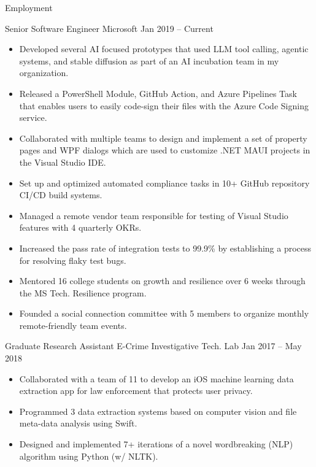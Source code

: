\documentclass[]{mcdowellcv}
\begin{document}
	\makeheader
	
	\begin{cvsection}{Employment}
		\begin{cvsubsection} {Senior Software Engineer} {Microsoft} {Jan 2019 -- Current}
			\begin{itemize}
				\item Developed several AI focused prototypes that used LLM tool calling, agentic systems, and stable diffusion as part of an AI incubation team in my organization.
				\item Released a PowerShell Module, GitHub Action, and Azure Pipelines Task that enables users to easily code-sign their files with the Azure Code Signing service.
				\item Collaborated with multiple teams to design and implement a set of property pages and WPF dialogs which are used to customize .NET MAUI projects in the Visual Studio IDE.
                \item Set up and optimized automated compliance tasks in 10+ GitHub repository CI/CD build systems.
				\item Managed a remote vendor team responsible for testing of Visual Studio features with 4 quarterly OKRs.
				\item Increased the pass rate of integration tests to 99.9\% by establishing a process for resolving flaky test bugs.	
				\item Mentored 16 college students on growth and resilience over 6 weeks through the MS Tech. Resilience program.
				\item Founded a social connection committee with 5 members to organize monthly remote-friendly team events.
			\end{itemize}
		\end{cvsubsection}

		\begin{cvsubsection} {Graduate Research Assistant} {E-Crime Investigative Tech. Lab} {Jan 2017 -- May 2018}
			\begin{itemize}
				\item Collaborated with a team of 11 to develop an iOS machine learning data extraction app for law enforcement that protects user privacy.
				\item Programmed 3 data extraction systems based on computer vision and file meta-data analysis using Swift.
				\item Designed and implemented 7+ iterations of a novel wordbreaking (NLP) algorithm using Python (w/ NLTK).
			\end{itemize}
		\end{cvsubsection}
		

\end{cvsection}
\end{document}
